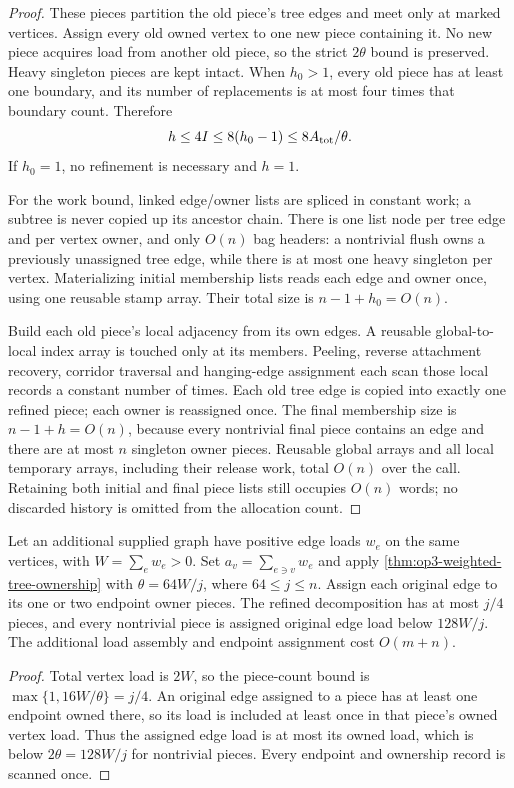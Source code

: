 \begin{proof}
These pieces partition the old piece's tree edges and meet only at
marked vertices. Assign every old owned vertex to one new piece
containing it. No new piece acquires load from another old piece, so
the strict $2\theta$ bound is preserved. Heavy singleton pieces are
kept intact. When $h_0>1$, every old piece has at least one boundary,
and its number of replacements is at most four times that boundary
count. Therefore
\[
 h\leq4I\leq8(h_0-1)\leq8A_{\rm tot}/\theta.
\]
If $h_0=1$, no refinement is necessary and $h=1$.

For the work bound, linked edge/owner lists are spliced in constant
work; a subtree is never copied up its ancestor chain. There is one
list node per tree edge and per vertex owner, and only $O(n)$ bag
headers: a nontrivial flush owns a previously unassigned tree edge,
while there is at most one heavy singleton per vertex. Materializing
initial membership lists reads each edge and owner once, using one
reusable stamp array. Their total size is $n-1+h_0=O(n)$.

Build each old piece's local adjacency from its own edges. A reusable
global-to-local index array is touched only at its members. Peeling,
reverse attachment recovery, corridor traversal and hanging-edge
assignment each scan those local records a constant number of times.
Each old tree edge is copied into exactly one refined piece; each owner
is reassigned once. The final membership size is $n-1+h=O(n)$, because
every nontrivial final piece contains an edge and there are at most $n$
singleton owner pieces. Reusable global arrays and all local temporary
arrays, including their release work, total $O(n)$ over the call.
Retaining both initial and final piece lists still occupies $O(n)$
words; no discarded history is omitted from the allocation count.
\end{proof}

\begin{corollary}
\label{cor:op3-weighted-edge-ownership}
Let an additional supplied graph have positive edge loads $w_e$ on the
same vertices, with $W=\sum_e w_e>0$. Set
$a_v=\sum_{e\ni v}w_e$ and apply
\cref{thm:op3-weighted-tree-ownership} with
$\theta=64W/j$, where $64\leq j\leq n$.
Assign each original edge to its one or two endpoint owner pieces.
The refined decomposition has at most $j/4$ pieces, and every
nontrivial piece is assigned original edge load below $128W/j$.
The additional load assembly and endpoint assignment cost $O(m+n)$.
\end{corollary}
\begin{proof}
Total vertex load is $2W$, so the piece-count bound is
$\max\{1,16W/\theta\}=j/4$. An original edge assigned to a piece
has at least one endpoint owned there, so its load is included at least
once in that piece's owned vertex load. Thus the assigned edge load is
at most its owned load, which is below $2\theta=128W/j$ for nontrivial
pieces. Every endpoint and ownership record is scanned once.
\end{proof}

